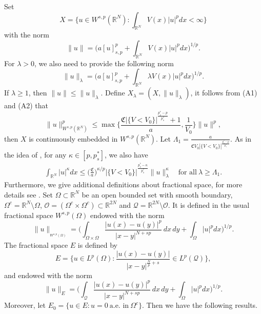\documentclass[reqno]{amsart}
\begin{document}
Set
$$
X=\Big\{u\in W^{s,p}(\mathbb{R}^N):\int_{\mathbb{R}^N}V(x)|u|^pdx<\infty \Big\}
$$
with the norm
$$
\|u\|=\Big(a[u]_{s,p}^p+\int_{\mathbb{R}^N}V(x)|u|^pdx\Big)^{1/p}.
$$
For $\lambda>0$, we also need to provide the following norm
$$
\|u\|_\lambda=\Big(a[u]_{s,p}^p+\int_{\mathbb{R}^N}\lambda V(x)|u|^pdx\Big)^{1/p}.
$$
If $\lambda\geq1$, then $\|u\|\leq\|u\|_\lambda$. Define $X_\lambda=(X, \|u\|_\lambda)$, 
it follows from (A1) and (A2) that
$$
\|u\|^p_{W^{s,p}(\mathbb{R}^N)}
\leq \max \Big\{\frac{\mathfrak{C}|\{V<V_0\}|^{\frac{p^*_s-p}{p^*_s}}+1}{a}, 
\frac{1}{V_0} \Big\}\|u\|^p,
$$
then $X$ is continuously embedded in $W^{s,p}(\mathbb{R}^N)$. 
Let $\Lambda_1=\frac{a}{\mathfrak{C}V_0|\{V<V_0\}|^{\frac{p^*_s-p}{p^*_s}}}$.
As in the idea of  \cite{r23}, for any $\kappa\in[p, p^*_s]$, we also have
\begin{equation}\label{lab2.1}
\begin{gathered}
\int_{\mathbb{R}^N}|u|^\kappa dx
\leq \Big(\frac{\mathfrak{C}}{a}\Big)^{\kappa/p}|\{V<V_0\}
|^{\frac{p^*_s-\kappa}{p^*_s}}
\|u\|^\kappa_\lambda\quad \text{for all}\ \lambda\geq\Lambda_1.
\end{gathered}
\end{equation}
Furthermore, we give additional definitions about fractional space, for more 
details see \cite{r5, r9, r22, r31}. 
Set $\Omega\subset\mathbb{R}^N$ be an open bounded set with smooth boundary, 
$\Omega^c=\mathbb{R}^N\setminus \Omega$, 
$\mathcal{O}=(\Omega^c\times\Omega^c)\subset\mathbb{R}^{2N}$ and 
$\mathcal{Q}=\mathbb{R}^{2N}\setminus \mathcal{O}$. 
It is defined in the usual fractional space $W^{s,p}(\Omega)$ endowed with the norm
$$
\|u\|_{_{W^{s,p}(\Omega)}}
=\Big(\int_{\Omega\times\Omega}\frac{|u(x)-u(y)|^p}{|x-y|^{N+sp}}\,dx\,dy
+\int_{\Omega}|u|^pdx\Big)^{1/p}.
$$
The fractional space $E$ is defined by
$$
E=\Big\{u\in L^p(\Omega): \frac{|u(x)-u(y)|}{|x-y|^{\frac{N}{p}+s}}
\in L^p(\mathcal{Q})\Big\},
$$
and endowed with the norm
$$
\|u\|_E=\Big(\int_\mathcal{Q}\frac{|u(x)-u(y)|^p}{|x-y|^{N+sp}}\,dx\,dy
+\int_\Omega |u|^pdx\Big)^{1/p}.
$$
Moreover, let
$E_0=\{u\in E: u=0\ \text{a.e. in}\ \Omega^c\}$.
Then we have the following results.
\end{document}
